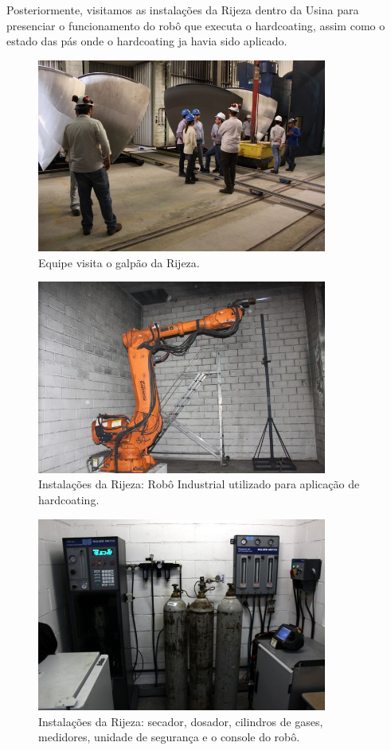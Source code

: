 \documentclass{article}
\begin{document}
Posteriormente, visitamos as instalações da Rijeza dentro da Usina para presenciar o funcionamento do robô que executa o hardcoating, assim como 
o estado das pás onde o hardcoating ja havia sido aplicado. 

\begin{figure}[H]
\centering
\includegraphics[width=0.85\textwidth]{Fotos/img_4881.jpg}
\caption{Equipe visita o galpão da Rijeza.}
\end{figure}
\begin{figure}[H]
\centering
\includegraphics[width=0.85\textwidth]{Fotos/img_4858.jpg}
\caption{Instalações da Rijeza: Robô Industrial utilizado para
aplicação de hardcoating.}
\end{figure}
\begin{figure}[H]
\centering
\includegraphics[width=0.85\textwidth]{Fotos/img_4850.jpg}
\caption{Instalações da Rijeza: secador, dosador, cilindros de gases, medidores,
unidade de segurança e o console do robô.}
\end{figure}
\end{document}
